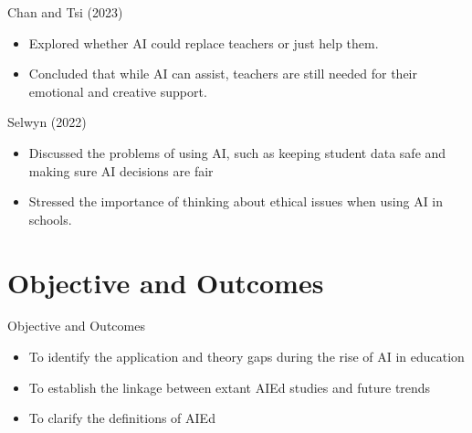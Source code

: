 \documentclass[serif, aspectratio=169]{beamer}
\begin{document}
\begin{frame}{Chan and Tsi (2023)}

         \begin{itemize}
			\item Explored whether AI could replace teachers or just help them.
			\item Concluded that while AI can assist, teachers are still needed for their emotional and creative support.
        
	\end{itemize}

\end{frame}

\begin{frame}{Selwyn (2022)}

         \begin{itemize}
			\item Discussed the problems of using AI, such as keeping student data safe and making sure AI decisions are fair
			\item Stressed the importance of thinking about ethical issues when using AI in schools.

        
	\end{itemize}

\end{frame}


\section{Objective and Outcomes}
\begin{frame}{Objective and Outcomes}

        \begin{itemize}
			\item To identify the application and theory gaps during the rise of AI in education
			\item To establish the linkage between extant AIEd studies and future trends
			\item To clarify the definitions of AIEd
        
	\end{itemize}

\end{frame}



\end{document}

